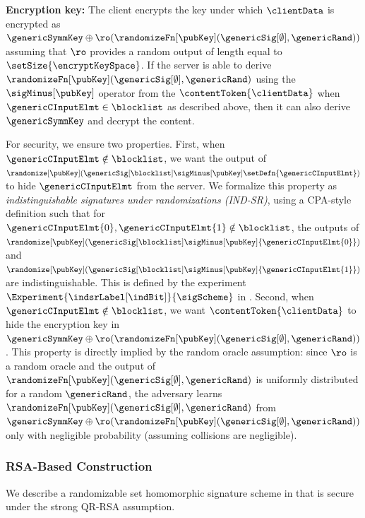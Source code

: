 \item \textbf{Encryption key:} The client encrypts the key under which $\clientData$ is encrypted as $\genericSymmKey \oplus \ro(\randomizeFn[\pubKey](\genericSig[\emptyset], \genericRand))$ assuming that $\ro$ provides a random output of length equal to $\setSize{\encryptKeySpace}$. If the server is able to derive $\randomizeFn[\pubKey](\genericSig[\emptyset], \genericRand)$ using the $\sigMinus[\pubKey]$ operator from the $\contentToken{\clientData}$ when $\genericCInputElmt \in \blocklist$ as described above, then it can also derive $\genericSymmKey$ and decrypt the content.

\itemListEnd


For security, we ensure two properties. First, when 
$\genericCInputElmt \notin \blocklist$, we want the output of $\randomize[\pubKey](\genericSig[\blocklist] \sigMinus[\pubKey] 
\setDefn{\genericCInputElmt})$ to hide 
$\genericCInputElmt$ from the server. We formalize this property as \emph{indistinguishable signatures under randomizations (IND-SR)}, using a CPA-style definition such that for $\genericCInputElmt{0}, \genericCInputElmt{1} \notin \blocklist$,
the outputs of $\randomize[\pubKey](\genericSig[\blocklist]
\sigMinus[\pubKey] \{\genericCInputElmt{0}\})$ and
$\randomize[\pubKey](\genericSig[\blocklist] \sigMinus[\pubKey]
\{\genericCInputElmt{1}\})$ are indistinguishable. This is defined by the experiment $\Experiment{\indsrLabel[\indBit]}{\sigScheme}$ in . Second, when $\genericCInputElmt \notin \blocklist$, we want $\contentToken{\clientData}$ to hide the encryption key in $\genericSymmKey \oplus \ro(\randomizeFn[\pubKey](\genericSig[\emptyset], \genericRand))$. This property is directly implied by the random oracle assumption: since $\ro$ is a random oracle and the output of $\randomizeFn[\pubKey](\genericSig[\emptyset], \genericRand)$ is uniformly distributed for a random $\genericRand$, the adversary learns $\randomizeFn[\pubKey](\genericSig[\emptyset], \genericRand)$ from $\genericSymmKey \oplus \ro(\randomizeFn[\pubKey](\genericSig[\emptyset], \genericRand))$ only with negligible probability (assuming collisions are negligible).





\subsubsection{RSA-Based Construction}

We describe a randomizable set homomorphic signature scheme in  that is secure under the strong QR-RSA assumption. 

